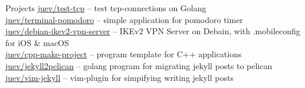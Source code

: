 \documentclass{resume} %
\begin{document}
\begin{rSection}{Projects}
\href{https://github.com/juev/test-tcp}{juev/test-tcp} -- test tcp-connections on Golang \\ %
\href{https://github.com/juev/terminal-pomodoro}{juev/terminal-pomodoro} -- simple application for pomodoro timer \\ %
\href{https://github.com/juev/debian-ikev2-vpn-server}{juev/debian-ikev2-vpn-server} -- IKEv2 VPN Server on Debain, with .mobileconfig for iOS \& macOS \\ %
\href{https://github.com/juev/cpp-make-project}{juev/cpp-make-project} -- program template for C++ applications \\ %
\href{https://github.com/juev/jekyll2pelican}{juev/jekyll2pelican} -- golang program for migrating jekyll posts to pelican \\ %
\href{https://github.com/juev/vim-jekyll}{juev/vim-jekyll} -- vim-plugin for simpifying writing jekyll posts \\ %

\end{rSection}
\end{document}
